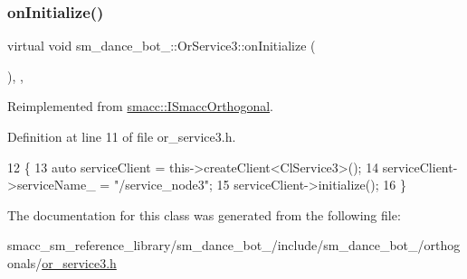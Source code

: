 \subsubsection{\texorpdfstring{on\+Initialize()}{onInitialize()}}
{\footnotesize\ttfamily virtual void sm\+\_\+dance\+\_\+bot\+\_\+::\+Or\+Service3\+::on\+Initialize (\begin{DoxyParamCaption}{ }\end{DoxyParamCaption})\hspace{0.3cm}{\ttfamily [inline]}, {\ttfamily [override]}, {\ttfamily [virtual]}}



Reimplemented from \hyperlink{classsmacc_1_1ISmaccOrthogonal_a6bb31c620cb64dd7b8417f8705c79c7a}{smacc\+::\+I\+Smacc\+Orthogonal}.



Definition at line 11 of file or\+\_\+service3.\+h.


\begin{DoxyCode}
12     \{
13         \textcolor{keyword}{auto} serviceClient = this->createClient<ClService3>();
14         serviceClient->serviceName\_ = \textcolor{stringliteral}{"/service\_node3"};
15         serviceClient->initialize();
16     \}
\end{DoxyCode}


The documentation for this class was generated from the following file\+:\begin{DoxyCompactItemize}
\item 
smacc\+\_\+sm\+\_\+reference\+\_\+library/sm\+\_\+dance\+\_\+bot\+\_/include/sm\+\_\+dance\+\_\+bot\+\_/orthogonals/\hyperlink{sm__dance__bot__2_2include_2sm__dance__bot__2_2orthogonals_2or__service3_8h}{or\+\_\+service3.\+h}\end{DoxyCompactItemize}
